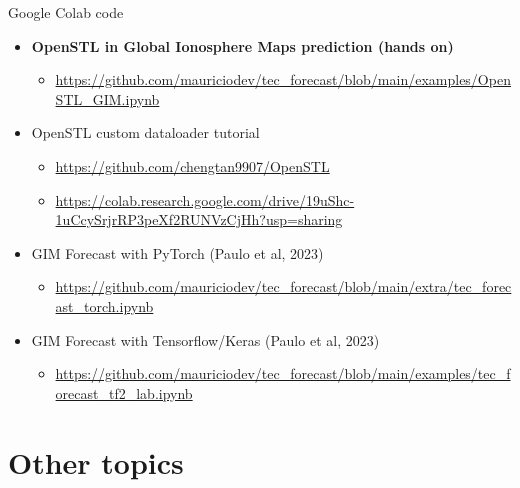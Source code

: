 \documentclass{beamer}
\begin{document}
\begin{frame}{Google Colab code}
    \small
    \begin{itemize}
        \item \textbf{OpenSTL in Global Ionosphere Maps prediction (hands on)}
        \begin{itemize}
            \item \url{https://github.com/mauriciodev/tec_forecast/blob/main/examples/OpenSTL_GIM.ipynb}
        \end{itemize}
        \item OpenSTL custom dataloader tutorial
        \begin{itemize}
            \item \url{https://github.com/chengtan9907/OpenSTL}
            \item \url{https://colab.research.google.com/drive/19uShc-1uCcySrjrRP3peXf2RUNVzCjHh?usp=sharing}
        \end{itemize}
        \item GIM Forecast with PyTorch {\tiny (Paulo et al, 2023)}
        \begin{itemize}
            \item \url{https://github.com/mauriciodev/tec_forecast/blob/main/extra/tec_forecast_torch.ipynb}
        \end{itemize}
        \item GIM Forecast with Tensorflow/Keras {\tiny (Paulo et al, 2023)}
        \begin{itemize}
            \item \url{https://github.com/mauriciodev/tec_forecast/blob/main/examples/tec_forecast_tf2_lab.ipynb}
        \end{itemize}
    \end{itemize}
\end{frame}

\section{Other topics}
\end{document}
